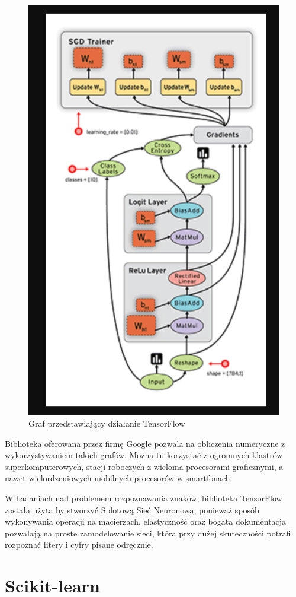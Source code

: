\documentclass[brudnopis]{xmgr}
\begin{document}
\begin{figure}[!tbh]
\centering
\includegraphics[width=.8\hsize]{fig/tf}
\caption{Graf przedstawiający działanie TensorFlow}
\end{figure}
\newpage

Biblioteka oferowana przez firmę Google pozwala na obliczenia numeryczne z wykorzystywaniem takich grafów. Można tu korzystać z ogromnych klastrów superkomputerowych, stacji roboczych z wieloma procesorami graficznymi, a nawet wielordzeniowych mobilnych procesorów w smartfonach.

W badaniach nad problemem rozpoznawania znaków, biblioteka TensorFlow została użyta by stworzyć Splotową  Sieć Neuronową, ponieważ sposób wykonywania operacji na macierzach, elastyczność oraz bogata dokumentacja pozwalają na proste zamodelowanie sieci, która przy dużej skuteczności potrafi rozpoznać litery i cyfry pisane odręcznie.

\section{Scikit-learn}
\end{document}
